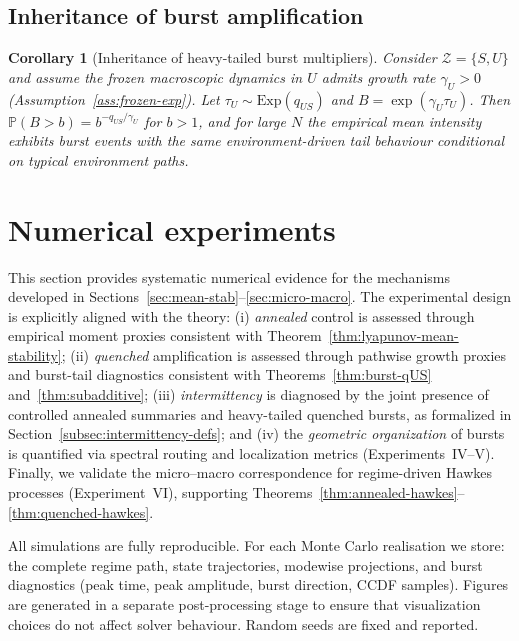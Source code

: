 \documentclass[12pt,a4paper]{article}
\theoremstyle{plain}
\newtheorem{corollary}[theorem]{Corollary}
\theoremstyle{definition}
\theoremstyle{remark}
\begin{document}
\subsection{Inheritance of burst amplification}
\label{subsec:inheritance}

\begin{corollary}[Inheritance of heavy-tailed burst multipliers]
	\label{cor:burst-inheritance}
	Consider $\mathcal Z=\{S,U\}$ and assume the frozen macroscopic dynamics in $U$ admits
	growth rate $\gamma_U>0$ (Assumption~\ref{ass:frozen-exp}). Let $\tau_U\sim\mathrm{Exp}(q_{US})$
	and $B=\exp(\gamma_U\tau_U)$. Then $\mathbb P(B>b)=b^{-q_{US}/\gamma_U}$ for $b>1$, and for large $N$
	the empirical mean intensity exhibits burst events with the same environment-driven tail behaviour
	conditional on typical environment paths.
\end{corollary}

\section{Numerical experiments}
\label{sec:numerics}

This section provides systematic numerical evidence for the mechanisms developed in
Sections~\ref{sec:mean-stab}--\ref{sec:micro-macro}.
The experimental design is explicitly aligned with the theory:
(i) \emph{annealed} control is assessed through empirical moment proxies consistent with
Theorem~\ref{thm:lyapunov-mean-stability};
(ii) \emph{quenched} amplification is assessed through pathwise growth proxies and burst-tail diagnostics consistent with
Theorems~\ref{thm:burst-qUS} and~\ref{thm:subadditive};
(iii) \emph{intermittency} is diagnosed by the joint presence of controlled annealed summaries and heavy-tailed quenched bursts,
as formalized in Section~\ref{subsec:intermittency-defs}; and
(iv) the \emph{geometric organization} of bursts is quantified via spectral routing and localization metrics (Experiments~IV--V).
Finally, we validate the micro--macro correspondence for regime-driven Hawkes processes (Experiment~VI), supporting
Theorems~\ref{thm:annealed-hawkes}--\ref{thm:quenched-hawkes}.

All simulations are fully reproducible.
For each Monte Carlo realisation we store: the complete regime path, state trajectories, modewise projections, and burst diagnostics
(peak time, peak amplitude, burst direction, CCDF samples).
Figures are generated in a separate post-processing stage to ensure that visualization choices do not affect solver behaviour.
Random seeds are fixed and reported.
\end{document}
